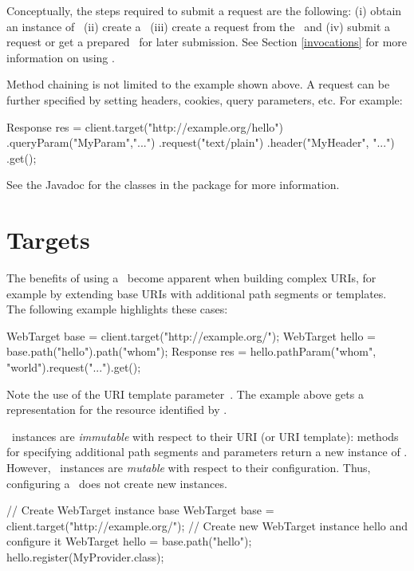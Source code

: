 Conceptually, the steps required to submit a request are the following: (i) obtain an instance of \Client\ (ii) create a \WebTarget\ (iii) create a request from the \WebTarget\ and (iv) submit a request or get a prepared \Invocation\ for later submission. See Section \ref{invocations} for more information on using \Invocation.

Method chaining is not limited to the example shown above. A request can be further specified by setting headers, cookies, query parameters, etc. For example:

\begin{listing}{1}
Response res = client.target("http://example.org/hello")
    .queryParam("MyParam","...")
    .request("text/plain")
    .header("MyHeader", "...")
    .get();
\end{listing}

See the Javadoc for the classes in the  package for more information.

\section{Targets}

The benefits of using a \WebTarget\ become apparent when building complex URIs, for example by extending base URIs with additional path segments or templates. The following example highlights these cases:

\begin{listing}{1}
WebTarget base = client.target("http://example.org/");
WebTarget hello = base.path("hello").path("{whom}");   
Response res = hello.pathParam("whom", "world").request("...").get();
\end{listing}

Note the use of the URI template parameter~. The example above gets a representation for the resource identified by .

\WebTarget\ instances are {\em immutable} with respect to their URI (or URI template): methods for specifying additional path segments and parameters return a new instance of \WebTarget. However, \WebTarget\ instances are {\em mutable} with respect to their configuration. Thus, configuring a \WebTarget\ does not create new instances.

\begin{listing}{1}
// Create WebTarget instance base
WebTarget base = client.target("http://example.org/");
// Create new WebTarget instance hello and configure it
WebTarget hello = base.path("hello");
hello.register(MyProvider.class);
\end{listing}

